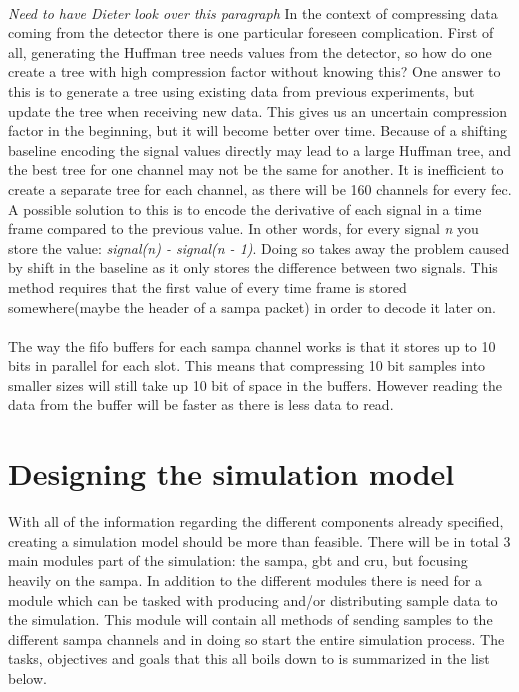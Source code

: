 \documentclass[a4paper, 12pt]{report}
\begin{document}
\paragraph{}
\textit{Need to have Dieter look over this paragraph}
In the context of compressing data coming from the detector there is one particular foreseen complication.
First of all, generating the Huffman tree needs values from the detector, so how do one create a tree with high compression factor without knowing this?
One answer to this is to generate a tree using existing data from previous experiments, but update the tree when receiving new data.
This gives us an uncertain compression factor in the beginning, but it will become better over time.
Because of a shifting baseline encoding the signal values directly may lead to a large Huffman tree, and the best tree for one channel may not be the same for another.
It is inefficient to create a separate tree for each channel, as there will be 160 channels for every \gls{fec}.
A possible solution to this is to encode the derivative of each signal in a time frame compared to the previous value.
In other words, for every signal \textit{n} you store the value: \textit{signal(n) - signal(n - 1)}.
Doing so takes away the problem caused by shift in the baseline as it only stores the difference between two signals.
This method requires that the first value of every time frame is stored somewhere(maybe the header of a \gls{sampa} packet) in order to decode it later on.


\paragraph{}
The way the \gls{fifo} buffers for each \gls{sampa} channel works is that it stores up to 10 bits in parallel for each slot.
This means that compressing 10 bit samples into smaller sizes will still take up 10 bit of space in the buffers. 
However reading the data from the buffer will be faster as there is less data to read.

\section{Designing the simulation model}
With all of the information regarding the different components already specified, creating a simulation model should be more than feasible.
There will be in total 3 main modules part of the simulation: the \gls{sampa}, \gls{gbt} and \gls{cru}, but focusing heavily on the \gls{sampa}.
In addition to the different modules there is need for a module which can be tasked with producing and/or distributing sample data to the simulation.
This module will contain all methods of sending samples to the different \gls{sampa} channels and in doing so start the entire simulation process.
The tasks, objectives and goals that this all boils down to is summarized in the list below.
\end{document}
